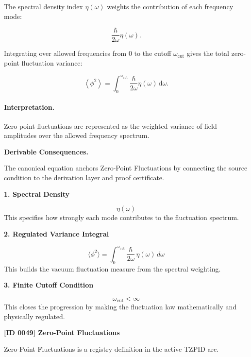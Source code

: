 The spectral density index $\eta(\omega)$ weights the contribution of each frequency mode:

\begin{equation}
\frac{\hbar}{2\omega}\eta(\omega).
\end{equation}

Integrating over allowed frequencies from $0$ to the cutoff $\omega_{\mathrm{cut}}$ gives the total zero-point fluctuation variance:

\begin{equation}
\boxed{
\left\langle\phi^2\right\rangle
=
\int_{0}^{\omega_{\mathrm{cut}}}
\frac{\hbar}{2\omega}
\eta(\omega)
\,\mathrm{d}\omega .
}
\end{equation}

\paragraph{Interpretation.}
Zero-point fluctuations are represented as the weighted variance of field amplitudes over the allowed frequency spectrum.

\par\vspace{0.35em}
\noindent\textbf{Derivable Consequences.}\quad
\begingroup
\footnotesize
\raggedright
The canonical equation anchors Zero-Point Fluctuations by connecting the source condition to the derivation layer and proof certificate.
\par\endgroup

\noindent\textbf{1. Spectral Density}\par
\[
\eta(\omega)
\]
\noindent This specifies how strongly each mode contributes to the fluctuation spectrum.\par
\noindent\textbf{2. Regulated Variance Integral}\par
\[
\langle \phi^{2} \rangle
=
\int_{0}^{\omega_{\mathrm{cut}}}
\frac{\hbar}{2\omega}\,
\eta(\omega)\,d\omega
\]
\noindent This builds the vacuum fluctuation measure from the spectral weighting.\par
\noindent\textbf{3. Finite Cutoff Condition}\par
\[
\omega_{\mathrm{cut}} < \infty
\]
\noindent This closes the progression by making the fluctuation law mathematically and physically regulated.\par

\clearpage
\noindent\textbf{[ID 0049] Zero-Point Fluctuations}\par
\vspace{0.35em}
\begingroup\small
{}
Zero-Point Fluctuations is a registry definition in the active TZPID arc.

